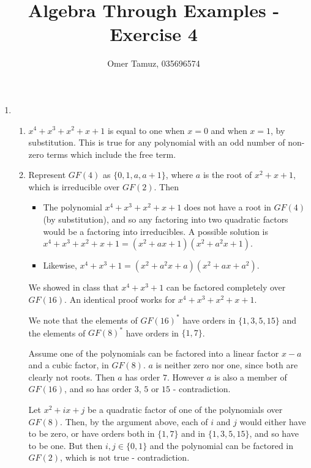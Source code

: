 \documentclass[11pt]{article} \usepackage{amssymb}
\begin{document}
\title{Algebra Through Examples - Exercise 4}

 \author{Omer Tamuz, 035696574}
\maketitle


\begin{enumerate}
\item 
  \begin{enumerate}
  \item 

    $x^4+x^3+x^2+x+1$ is equal to one when $x=0$ and when $x=1$, by
    substitution. This is true for any polynomial with an odd number
    of non-zero terms which include the free term.
  \item

    Represent $GF(4)$ as $\{0,1,a,a+1\}$, where $a$ is the
    root of $x^2+x+1$, which is irreducible over $GF(2)$. Then
    \begin{itemize}
    \item The polynomial $x^4+x^3+x^2+x+1$ does not have a root in $GF(4)$
      (by substitution), and so any factoring into two quadratic factors
      would be a factoring into irreducibles. A possible solution is
      $x^4+x^3+x^2+x+1=(x^2+ax+1)(x^2+a^2x+1)$.

    \item 
      Likewise, $x^4+x^3+1=(x^2+a^2x+a)(x^2+ax+a^2)$.

    \end{itemize}

    We showed in class that $x^4+x^3+1$ can be factored completely over 
    $GF(16)$. An identical proof works for $x^4+x^3+x^2+x+1$. 
    
    We note that the elements of $GF(16)^*$ have orders in $\{1,3,5,15\}$
    and the elements of $GF(8)^*$ have orders in $\{1,7\}$.

    Assume one of the polynomials can be factored into a linear factor $x-a$
    and a cubic factor, in $GF(8)$. $a$ is neither zero nor one, since 
    both are clearly not roots. Then $a$ has order $7$. However $a$ is 
    also a member of $GF(16)$, and so has order $3$, $5$ or $15$ - 
    contradiction.

    Let $x^2+ix+j$ be a quadratic factor of one of the polynomials over $GF(8)$.
    Then, by the argument above, each of $i$ and $j$ would either have to be 
    zero, or have orders 
    both in $\{1,7\}$ and in $\{1,3,5,15\}$, and so have to be one. But then 
    $i,j\in\{0,1\}$ and
    the polynomial can be factored in $GF(2)$, which is not true - 
    contradiction.
    

\end{enumerate}
\end{enumerate}
\end{document}
